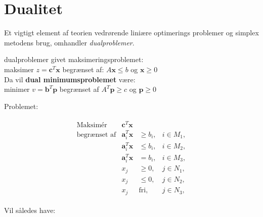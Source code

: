 \section{Dualitet}


Et vigtigt element af teorien vedrørende liniære optimerings problemer og simplex metodens brug, omhandler \textit{dualproblemer}.

\begin{defn}{}{dualproblemer}
givet maksimeringsproblemet: \\
maksimer $z=\mathbf{c}^T \mathbf{x}$ begrænset af: $A\mathbf{x} \leq b$ og $\mathbf{x} \geq 0$ \\
Da vil \textbf{dual minimumsproblemet} være: \\
minimer $v=\mathbf{b}^T \mathbf{p}$ begrænset af $A^T \mathbf{p} \geq c$ og $\mathbf{p} \geq 0$
\end{defn}
Problemet:

\begin{align*}
\begin{array}{lrll}
\text{Maksimér}		&\textbf{c}^T\textbf{x}	&			&\\
\text{begrænset af}	&\textbf{a}_i^T\textbf{x}	&\geq b_i,	&i \in M_1,\\
					&\textbf{a}_i^T\textbf{x}	&\leq b_i,	&i \in M_2,\\
					&\textbf{a}_i^T\textbf{x}	& = b_i,	&i \in M_3,\\
					&x_j					&\geq 0,	&j \in N_1,\\
					&x_j					&\leq 0,	&j \in N_2,\\							&x_j					&\text{fri},	&j \in N_3,
\end{array}
\end{align*}

Vil således have:


